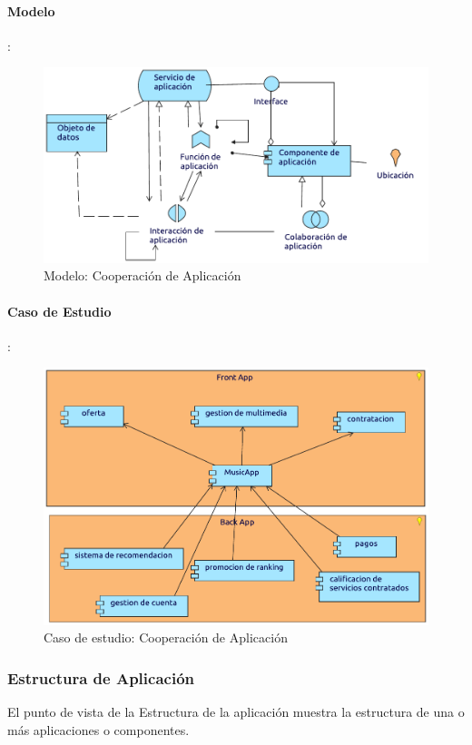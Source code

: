 \paragraph{Modelo}:
\begin{figure}[h!]
	\centering
	\includegraphics[width=\linewidth]{Desarrollo/ArquitecturaEmpresarial/Aplicacion/imgs/CooperacionMetamodelo.pdf}
	\caption{Modelo: Cooperación de Aplicación}
\end{figure}
\newpage
\paragraph{Caso de Estudio}:

\begin{figure}[h!]
	\centering
	\includegraphics[width=\linewidth]{Desarrollo/ArquitecturaEmpresarial/Aplicacion/imgs/Cooperacion.pdf}
	\caption{Caso de estudio: Cooperación de Aplicación }
\end{figure}

\newpage

\subsubsection{Estructura de Aplicación}
El punto de vista de la Estructura de la aplicación muestra la estructura de una o más aplicaciones o componentes. \vspace{\baselineskip}

